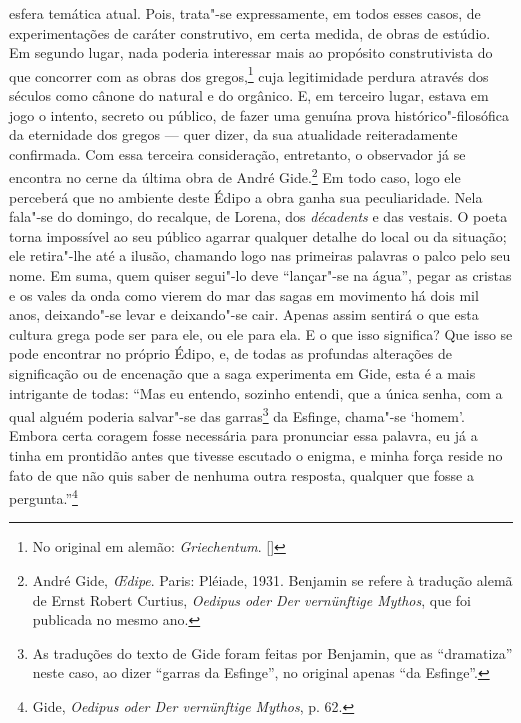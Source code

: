 esfera temática atual. Pois, trata"-se expressamente, em todos esses
casos, de experimentações de caráter construtivo, em certa medida, de
obras de estúdio. Em segundo lugar, nada poderia
interessar mais ao propósito construtivista do que concorrer com as obras
dos gregos,\footnote{No original em alemão: \emph{Griechentum}. []} cuja legitimidade perdura através dos
séculos como cânone do natural e do orgânico. E, em terceiro lugar,
estava em jogo o intento, secreto ou público, de fazer uma genuína prova
histórico"-filosófica da eternidade dos gregos --- quer dizer, da sua
atualidade reiteradamente confirmada. Com essa terceira consideração,
entretanto, o observador já se encontra no cerne da última obra de André
Gide.\footnote{André Gide, \emph{\OE dipe}. Paris: Pléiade, 1931.
  Benjamin se refere à tradução alemã de Ernst Robert Curtius,
  \emph{Oedipus oder Der vernünftige Mythos}, que foi publicada no mesmo
  ano. \versal{[N.~T.]}} Em todo caso, logo ele perceberá que no ambiente deste Édipo a
obra ganha sua peculiaridade. Nela fala"-se do domingo, do recalque, de
Lorena, dos \emph{décadents} e das vestais. O poeta torna
impossível ao seu público agarrar qualquer detalhe do local ou da
situação; ele retira"-lhe até a ilusão, chamando logo nas primeiras
palavras o palco pelo seu nome. Em suma, quem quiser segui"-lo deve
``lançar"-se na água'', pegar as cristas e os vales da onda como vierem
do mar das sagas em movimento há dois mil anos, deixando"-se levar e
deixando"-se cair. Apenas assim sentirá o que esta cultura grega pode
ser para ele, ou ele para ela. E o que isso significa? Que
isso se pode encontrar no próprio Édipo, e, de todas as profundas alterações de significação ou de
encenação que a saga experimenta em Gide, esta é a mais intrigante de
todas: ``Mas eu entendo, sozinho entendi, que a única senha, com a qual
alguém poderia salvar"-se das garras\footnote{As traduções do texto
  de Gide foram feitas por Benjamin, que as ``dramatiza'' neste caso, ao
  dizer ``garras da Esfinge'', no original apenas ``da Esfinge''. \versal{[N.~O.]}} da
Esfinge, chama"-se `homem'. Embora certa coragem fosse necessária para
pronunciar essa palavra, eu já a tinha em prontidão antes que tivesse
escutado o enigma, e minha força reside no fato de que não quis saber de
nenhuma outra resposta, qualquer que fosse a pergunta.''\footnote{Gide, \emph{Oedipus oder Der vernünftige Mythos}, p. 62. \versal{[N.~T.]}}

